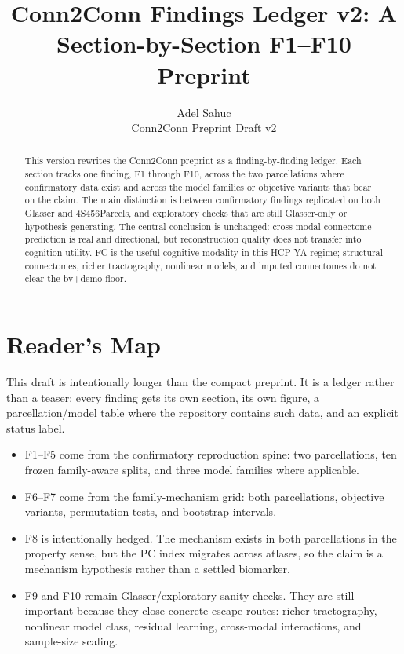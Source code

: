 \documentclass{article}
\title{Conn2Conn Findings Ledger v2: A Section-by-Section F1--F10 Preprint}
\author{Adel Sahuc\\Conn2Conn Preprint Draft v2}
\begin{document}
\maketitle

\begin{abstract}
This version rewrites the Conn2Conn preprint as a finding-by-finding ledger. Each section
tracks one finding, F1 through F10, across the two parcellations where confirmatory data
exist and across the model families or objective variants that bear on the claim. The
main distinction is between confirmatory findings replicated on both Glasser and
4S456Parcels, and exploratory checks that are still Glasser-only or hypothesis-generating.
The central conclusion is unchanged: cross-modal connectome prediction is real and
directional, but reconstruction quality does not transfer into cognition utility. FC is
the useful cognitive modality in this HCP-YA regime; structural connectomes, richer
tractography, nonlinear models, and imputed connectomes do not clear the bv+demo floor.
\end{abstract}

\section{Reader's Map}

This draft is intentionally longer than the compact preprint. It is a ledger rather than
a teaser: every finding gets its own section, its own figure, a parcellation/model table
where the repository contains such data, and an explicit status label.

\begin{itemize}
\item F1--F5 come from the confirmatory reproduction spine: two parcellations, ten frozen
family-aware splits, and three model families where applicable.
\item F6--F7 come from the family-mechanism grid: both parcellations, objective variants,
permutation tests, and bootstrap intervals.
\item F8 is intentionally hedged. The mechanism exists in both parcellations in the
property sense, but the PC index migrates across atlases, so the claim is a mechanism
hypothesis rather than a settled biomarker.
\item F9 and F10 remain Glasser/exploratory sanity checks. They are still important
because they close concrete escape routes: richer tractography, nonlinear model class,
residual learning, cross-modal interactions, and sample-size scaling.
\end{itemize}
\end{document}
